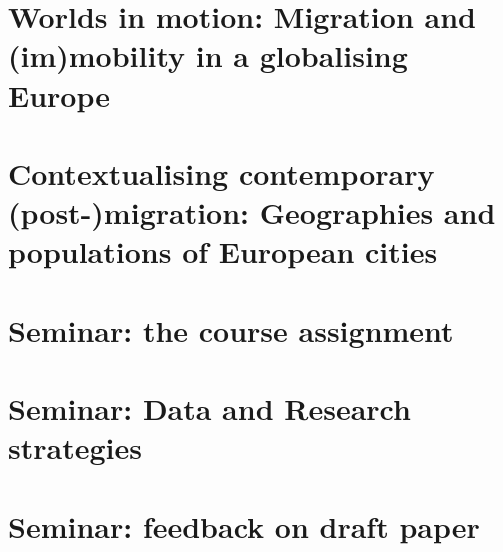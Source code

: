 \documentclass{article}
\begin{document}
\section{Worlds in motion: Migration and (im)mobility in a globalising Europe}
\date{November 22nd, 2021}

\section{Contextualising contemporary (post-)migration: Geographies and populations of European cities}
\date{November 29th, 2021}

\section{Seminar: the course assignment}
\date{October 11th, 2021}

\section{Seminar: Data and Research strategies}
\date{October 26th, 2021}



\section{Seminar: feedback on draft paper}
\date{December 13th, 2021}







\begin{outline}
	\1
\end{outline}
\end{document}

